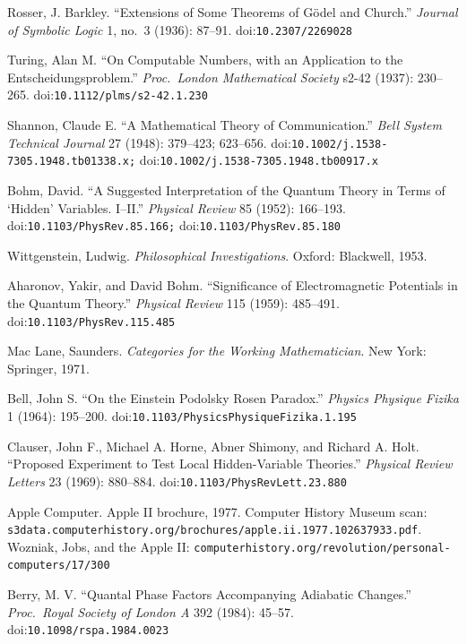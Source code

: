 \documentclass[11pt,a4paper]{article}
\theoremstyle{plain}
\theoremstyle{definition}
\theoremstyle{remark}
\begin{document}
{\begin{description}[leftmargin=1.1cm,labelwidth=1.0cm,labelsep=0.1cm,itemsep=1pt,font=\normalfont\bfseries]
\item[H28] Rosser, J. Barkley. ``Extensions of Some Theorems of G\"odel and Church.'' \emph{Journal of Symbolic Logic} 1, no.~3 (1936): 87--91. doi:\nolinkurl{10.2307/2269028}
\item[H29] Turing, Alan M. ``On Computable Numbers, with an Application to the Entscheidungsproblem.'' \emph{Proc.\ London Mathematical Society} s2-42 (1937): 230--265. doi:\nolinkurl{10.1112/plms/s2-42.1.230}
\item[H30] Shannon, Claude E. ``A Mathematical Theory of Communication.'' \emph{Bell System Technical Journal} 27 (1948): 379--423; 623--656. doi:\nolinkurl{10.1002/j.1538-7305.1948.tb01338.x;} doi:\nolinkurl{10.1002/j.1538-7305.1948.tb00917.x}
\item[H31] Bohm, David. ``A Suggested Interpretation of the Quantum Theory in Terms of `Hidden' Variables. I--II.'' \emph{Physical Review} 85 (1952): 166--193. doi:\nolinkurl{10.1103/PhysRev.85.166;} doi:\nolinkurl{10.1103/PhysRev.85.180}
\item[H32] Wittgenstein, Ludwig. \emph{Philosophical Investigations}. Oxford: Blackwell, 1953.
\item[H33] Aharonov, Yakir, and David Bohm. ``Significance of Electromagnetic Potentials in the Quantum Theory.'' \emph{Physical Review} 115 (1959): 485--491. doi:\nolinkurl{10.1103/PhysRev.115.485}
\item[H34] Mac Lane, Saunders. \emph{Categories for the Working Mathematician}. New York: Springer, 1971.
\item[H35] Bell, John S. ``On the Einstein Podolsky Rosen Paradox.'' \emph{Physics Physique Fizika} 1 (1964): 195--200. doi:\nolinkurl{10.1103/PhysicsPhysiqueFizika.1.195}
\item[H36] Clauser, John F., Michael A. Horne, Abner Shimony, and Richard A. Holt. ``Proposed Experiment to Test Local Hidden-Variable Theories.'' \emph{Physical Review Letters} 23 (1969): 880--884. doi:\nolinkurl{10.1103/PhysRevLett.23.880}
\item[H37] Apple Computer. Apple II brochure, 1977. Computer History Museum scan: \nolinkurl{s3data.computerhistory.org/brochures/apple.ii.1977.102637933.pdf}. Wozniak, Jobs, and the Apple II: \nolinkurl{computerhistory.org/revolution/personal-computers/17/300}
\item[H38] Berry, M. V. ``Quantal Phase Factors Accompanying Adiabatic Changes.'' \emph{Proc.\ Royal Society of London A} 392 (1984): 45--57. doi:\nolinkurl{10.1098/rspa.1984.0023}
\end{description}}
\end{document}
